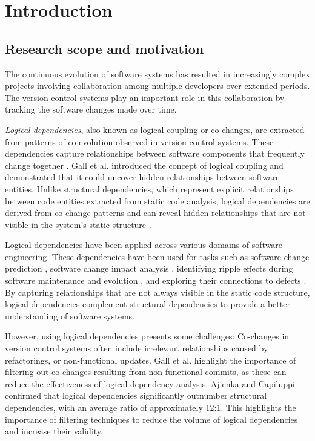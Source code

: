 \chapter{Introduction}
\section{Research scope and motivation}


The continuous evolution of software systems has resulted in increasingly complex projects involving collaboration among multiple developers over extended periods. The version control systems play an important role in this collaboration by tracking the software changes made over time.

\textit{Logical dependencies}, also known as logical coupling or co-changes, are extracted from patterns of co-evolution observed in version control systems. These dependencies capture relationships between software components that frequently change together \cite{Zimmermann:2004:MVH:998675.999460}.
Gall et al. \cite{Gall:1998:DLC:850947.853338, Gall:2003:CRH:942803.943741} introduced the concept of logical coupling and demonstrated that it could uncover hidden relationships between software entities.
Unlike structural dependencies, which represent explicit relationships between code entities extracted from static code analysis, logical dependencies are derived from co-change patterns and can reveal hidden relationships that are not visible in the system's static structure \cite{Gall:1998:DLC:850947.853338, Gall:2003:CRH:942803.943741, Yu:2007:UCC:1231330.1231370}.


Logical dependencies have been applied across various domains of software engineering. These dependencies have been used for tasks such as software change prediction \cite{Zimmermann:2004:MVH:998675.999460, Moonen-commit, article-Moonen}, software change impact analysis \cite{1553643}, identifying ripple effects during software maintenance and evolution \cite{DBLP:conf/issre/OlivaG15, Oliva:2011:ISL:2067853.2068086, Poshyvanyk2009}, and exploring their connections to defects \cite{wiese, Zimmermann:2004:MVH:998675.999460}. By capturing relationships that are not always visible in the static code structure, logical dependencies complement structural dependencies to provide a better understanding of software systems.

However, using logical dependencies presents some challenges: Co-changes in version control systems often include irrelevant relationships caused by refactorings, or non-functional updates. Gall et al. \cite{Gall:1998:DLC:850947.853338, Gall:2003:CRH:942803.943741} highlight the importance of filtering out co-changes resulting from non-functional commits, as these can reduce the effectiveness of logical dependency analysis. Ajienka and Capiluppi \cite{DBLP:journals/jss/AjienkaC17} confirmed that logical dependencies significantly outnumber structural dependencies, with an average ratio of approximately 12:1. This highlights the importance of filtering techniques to reduce the volume of logical dependencies and increase their validity.

